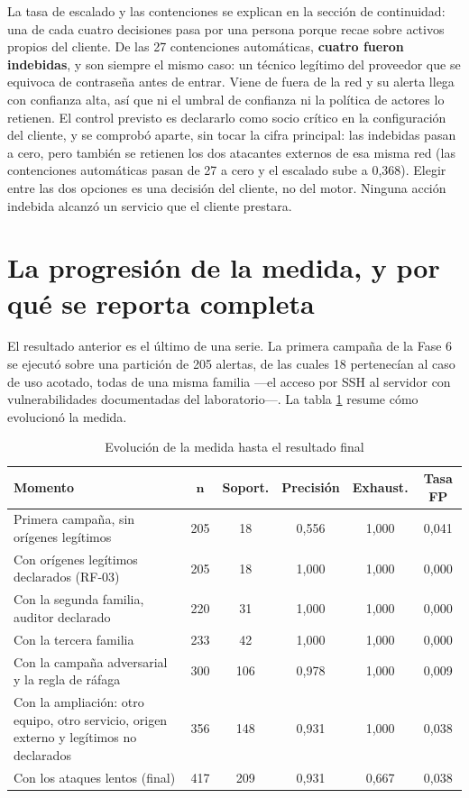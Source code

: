 La tasa de escalado y las contenciones se explican en la sección de continuidad: una de cada cuatro
decisiones pasa por una persona porque recae sobre activos propios del cliente. De las 27
contenciones automáticas, \textbf{cuatro fueron indebidas}, y son siempre el mismo caso: un técnico
legítimo del proveedor que se equivoca de contraseña antes de entrar. Viene de fuera de la red y su
alerta llega con confianza alta, así que ni el umbral de confianza ni la política de actores lo
retienen. El control previsto es declararlo como socio crítico en la configuración del cliente, y
se comprobó aparte, sin tocar la cifra principal: las indebidas pasan a cero, pero también se
retienen los dos atacantes externos de esa misma red (las contenciones automáticas pasan de 27 a
cero y el escalado sube a 0,368). Elegir entre las dos opciones es una decisión del cliente, no del
motor. Ninguna acción indebida alcanzó un servicio que el cliente prestara.

\section{La progresión de la medida, y por qué se reporta completa}
\label{sec:progresion-rf03}

El resultado anterior es el último de una serie. La primera campaña de la Fase 6 se ejecutó sobre
una partición de 205 alertas, de las cuales 18 pertenecían al caso de uso acotado, todas de una
misma familia ---el acceso por SSH al servidor con vulnerabilidades documentadas del laboratorio---.
La tabla \ref{tab:progresion} resume cómo evolucionó la medida.

\begin{table}[H]
  \centering
  \caption{Evolución de la medida hasta el resultado final}
  \label{tab:progresion}
  \begin{tabular}{@{}p{}ccccc@{}}
    \toprule
    \textbf{Momento} & $\boldsymbol{n}$ & \textbf{Soport.} & \textbf{Precisión} & \textbf{Exhaust.} & \textbf{Tasa FP} \\
    \midrule
    Primera campaña, sin orígenes legítimos & 205 & 18 & 0,556 & 1,000 & 0,041 \\
    Con orígenes legítimos declarados (RF-03) & 205 & 18 & 1,000 & 1,000 & 0,000 \\
    Con la segunda familia, auditor declarado & 220 & 31 & 1,000 & 1,000 & 0,000 \\
    Con la tercera familia & 233 & 42 & 1,000 & 1,000 & 0,000 \\
    Con la campaña adversarial y la regla de ráfaga & 300 & 106 & 0,978 & 1,000 & 0,009 \\
    Con la ampliación: otro equipo, otro servicio, origen externo y legítimos no declarados & 356 & 148 & 0,931 & 1,000 & 0,038 \\
    Con los ataques lentos (final) & 417 & 209 & 0,931 & 0,667 & 0,038 \\
    \bottomrule
  \end{tabular}
\end{table}


